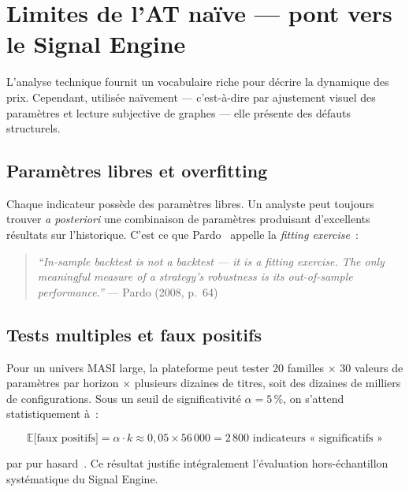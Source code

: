 \section{Limites de l'AT naïve — pont vers le Signal Engine}
\label{sec:at_limites}

L'analyse technique fournit un vocabulaire riche pour décrire la dynamique des prix.
Cependant, utilisée naïvement — c'est-à-dire par ajustement visuel des paramètres et
lecture subjective de graphes — elle présente des défauts structurels.

\subsection{Paramètres libres et overfitting}

Chaque indicateur possède des paramètres libres. Un analyste peut toujours trouver
\textit{a posteriori} une combinaison de paramètres produisant d'excellents résultats
sur l'historique. C'est ce que Pardo~\cite{pardo2008} appelle la \textit{fitting
exercise}~:

\begin{quote}
\textit{``In-sample backtest is not a backtest — it is a fitting exercise.
The only meaningful measure of a strategy's robustness is its out-of-sample performance.''}
\hfill — Pardo (2008, p.~64)
\end{quote}

\subsection{Tests multiples et faux positifs}

Pour un univers MASI large, la plateforme peut tester 20 familles × 30 valeurs de
paramètres par horizon × plusieurs dizaines de titres, soit des dizaines de milliers
de configurations. Sous un seuil de significativité $\alpha = 5\,\%$,
on s'attend statistiquement à~:

\begin{equation}
    \mathbb{E}\bigl[\text{faux positifs}\bigr] = \alpha \cdot k
    \approx 0{,}05 \times 56\,000 = 2\,800 \text{ indicateurs « significatifs »}
    \label{eq:faux_positifs_at}
\end{equation}

par pur hasard~\cite{bailey2014}. Ce résultat justifie intégralement l'évaluation
hors-échantillon systématique du Signal Engine.

